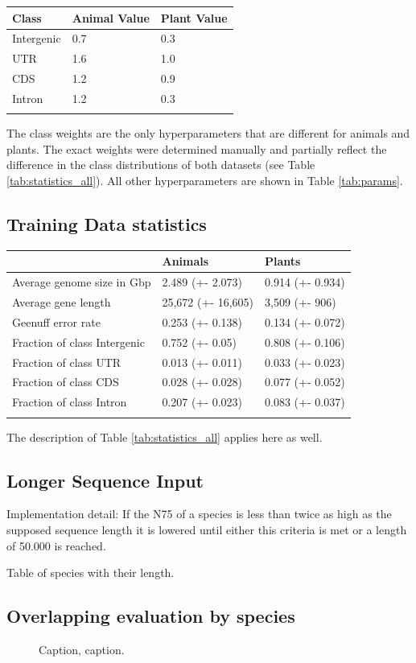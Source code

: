 \documentclass{bioinfo}
\begin{document}
\begin{table}[!t]
 {
\begin{tabular}{@{}lll@{}}
\toprule Class & Animal Value & Plant Value \\
\midrule
	Intergenic & 0.7 & 0.3 \\
	UTR & 1.6 & 1.0 \\
	CDS & 1.2 & 0.9 \\
	Intron & 1.2 & 0.3 \\
\botrule
\end{tabular}}{The class weights are the only hyperparameters that are different for animals and plants. The exact weights were determined manually and partially reflect the difference in the class distributions of both datasets (see Table \ref{tab:statistics_all}). All other hyperparameters are shown in Table \ref{tab:params}.}
\end{table}


\subsection{Training Data statistics}
\label{sec:training_data}
\begin{table}[!t]
 {
\begin{tabular}{@{}lll@{}}
\toprule & Animals & Plants\\
\midrule
Average genome size in Gbp& 2.489 (+- 2.073) & 0.914 (+- 0.934) \\
Average gene length & 25,672 (+- 16,605) & 3,509 (+- 906)\\
Geenuff error rate & 0.253 (+- 0.138) & 0.134 (+- 0.072) \\
Fraction of class Intergenic & 0.752 (+- 0.05) & 0.808 (+- 0.106) \\
Fraction of class UTR & 0.013 (+- 0.011) & 0.033 (+- 0.023) \\
Fraction of class CDS & 0.028 (+- 0.028) & 0.077 (+- 0.052) \\
Fraction of class Intron  & 0.207 (+- 0.023) & 0.083 (+- 0.037) \\
\botrule
\end{tabular}}{The description of Table \ref{tab:statistics_all} applies here as well.}
\end{table}

\subsection{Longer Sequence Input}
\label{sec:longer}
Implementation detail:
If the N75 of a species is less than twice as high as the supposed sequence length it is lowered until either this criteria is met or a length of 50.000 is reached. 

Table of species with their length.

\subsection{Overlapping evaluation by species}
\begin{figure}[!tpb]
\caption{Caption, caption.}\label{fig:animals_overlapping}
\end{figure}
\end{document}

